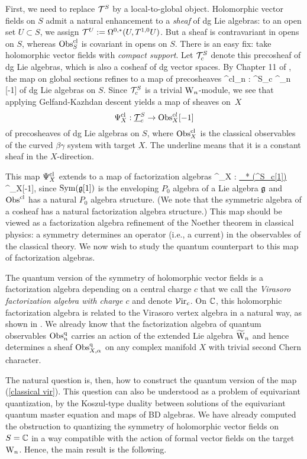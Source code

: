 First, we need to replace $\mathcal T^S$ by a local-to-global object.
Holomorphic vector fields on $S$ admit a natural enhancement to a {\em sheaf} of dg Lie algebras: to an open set $U \subset S$, we assign $\mathcal T^U := \Omega^{0,*}(U, T^{1,0}U)$.
But a sheaf is contravariant in opens on $S$, whereas ${\rm Obs}^{{\rm cl}}_S$ is covariant in opens on $S$.
There is an easy fix: take holomorphic vector fields with {\em compact support}.
Let $\mathcal T^S_c$ denote this precosheaf of dg Lie algebras, which is also a cosheaf of dg vector spaces. 
By Chapter 11 of \cite{CG2}, the map on global sections refines to a map of precosheaves 
\ben
\Psi^{\rm cl}_n : \cT^S_c \to \Obs^{\cl}_n [-1] 
\een
of dg Lie algebras on $S$.
Since $\mathcal T^S_c$ is a trivial ${{\rm W}_n}$-module, we see that applying Gelfand-Kazhdan descent yields a map of sheaves on~$X$
\[
\Psi^{{\rm cl}}_X : {\underline {\mathcal T}^S_c} \to {\rm Obs}^{cl}_X[-1]
\]
of precosheaves of dg Lie algebras on $S$, where ${\rm Obs}^{{\rm cl}}_X$ is the classical observables of the curved $\beta\gamma$ system with target $X$. The underline means that it is a constant sheaf in the $X$-direction. 

This map $\Psi^{{\rm cl}}_X$ extends to a map of factorization algebras
\be\label{classical vir}
\Psi^{\cl}_X : \ul{\Sym_* (\cT^S_c[1])} \to \Obs^{\cl}_X[-1], 
\ee 
since ${\rm Sym}(\mathfrak g[1])$ is the enveloping $P_0$ algebra of a Lie algebra $\mathfrak g$ and ${\rm Obs}^{{\rm cl}}$ has a natural $P_0$ algebra structure.
(We note that the symmetric algebra of a cosheaf has a natural factorization algebra structure.)
This map should be viewed as a factorization algebra refinement of the Noether theorem in classical physics: a symmetry determines an operator (i.e., a current) in the observables of the classical theory. 
We now wish to study the quantum counterpart to this map of factorization algebras. 

The quantum version of the symmetry of holomorphic vector fields is a factorization algebra depending on a central charge $c$ that we call the {\em Virasoro factorization algebra with charge $c$} and denote $\mathcal{V}{\rm ir}_{c}$. On $\mathbb C$, this holomorphic factorization algebra is related to the Virasoro vertex algebra in a natural way, as shown in \cite{bw_vir}. 
We already know that the factorization algebra of quantum observables ${\rm Obs}^{{\rm q}}_n$ carries an action of the extended Lie algebra $\widetilde{{{\rm W}}}_n$ and hence determines a sheaf ${\rm Obs}^{{\rm q}}_{X,\alpha}$ on any complex manifold $X$ with trivial second Chern character. 

The natural question is, then, how to construct the quantum version of the map (\ref{classical vir}). This question can also be understood as a problem of equivariant quantization, by the Koszul-type duality between solutions of the equivariant quantum master equation and maps of BD algebras. We have already computed the obstruction to quantizing the symmetry of holomorphic vector fields on $S = \mathbb C$ in a way compatible with the action of formal vector fields on the target ${{\rm W}_n}$. Hence, the main result is the following.

